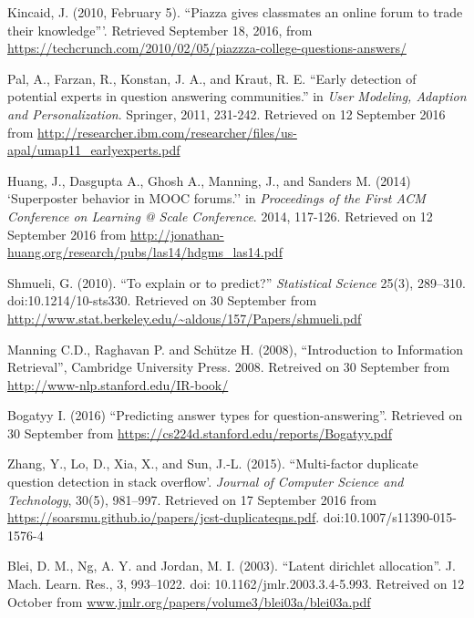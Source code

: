 \documentclass[journal]{IEEEtran}
\begin{document}
\begin{thebibliography}{1}

  
Kincaid, J. (2010, February 5). ``Piazza gives classmates an online forum to trade their knowledge'''. Retrieved September 18, 2016, from \url{https://techcrunch.com/2010/02/05/piazzza-college-questions-answers/}

Pal, A., Farzan, R., Konstan, J. A., and Kraut, R. E. ``Early detection of potential experts in question answering communities.'' in \emph{User Modeling, Adaption and Personalization}. Springer, 2011, 231-242. Retrieved on 12 September 2016 from \url{http://researcher.ibm.com/researcher/files/us-apal/umap11_earlyexperts.pdf}


Huang, J., Dasgupta A., Ghosh A., Manning, J., and Sanders M. (2014) `Superposter behavior in MOOC forums.'' in \emph{Proceedings of the First ACM Conference on Learning @ Scale Conference}. 2014, 117-126. Retrieved on 12 September 2016 from \url{http://jonathan-huang.org/research/pubs/las14/hdgms_las14.pdf}

Shmueli, G. (2010). ``To explain or to predict?'' \emph{Statistical Science} 25(3), 289–310. doi:10.1214/10-sts330. Retrieved on 30 September from \url{http://www.stat.berkeley.edu/~aldous/157/Papers/shmueli.pdf}

Manning C.D., Raghavan P. and Schütze H. (2008), ``Introduction to Information Retrieval'', Cambridge University Press. 2008. Retreived on 30 September from \url{http://www-nlp.stanford.edu/IR-book/}

Bogatyy I. (2016) ``Predicting answer types for question-answering''. Retrieved on 30 September from \url{https://cs224d.stanford.edu/reports/Bogatyy.pdf}

Zhang, Y., Lo, D., Xia, X., and Sun, J.-L. (2015). ``Multi-factor duplicate question detection in stack overflow'. \emph{Journal of Computer Science and Technology}, 30(5), 981–997. Retrieved on 17 September 2016 from \url{https://soarsmu.github.io/papers/jcst-duplicateqns.pdf}.  doi:10.1007/s11390-015-1576-4

Blei, D. M., Ng, A. Y. and Jordan, M. I. (2003). ``Latent dirichlet allocation''. J. Mach. Learn. Res., 3, 993--1022. doi: 10.1162/jmlr.2003.3.4-5.993. Retreived on 12 October from \url{www.jmlr.org/papers/volume3/blei03a/blei03a.pdf}


\end{thebibliography}
\end{document}
